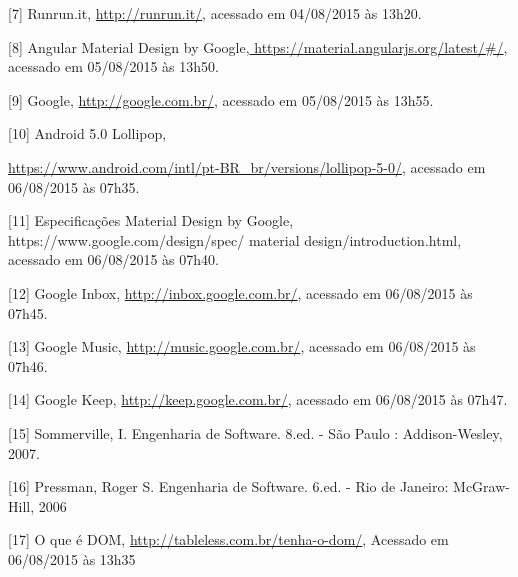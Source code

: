 \documentclass[
  12pt,				%
  openany,
  oneside,
  a4paper,			%
  english,			%
  brazil
]{article}
\numberwithin{figure}{section}
\numberwithin{table}{section}
\begin{document}
[7] Runrun.it, \url{http://runrun.it/}, acessado em 04/08/2015 às 13h20.

[8] Angular Material Design by Google,\url{ https://material.angularjs.org/latest/\#/}, acessado em 05/08/2015 às 13h50.

[9] Google, \url{http://google.com.br/}, acessado em 05/08/2015 às 13h55.

[10] Android 5.0 Lollipop,

\url{https://www.android.com/intl/pt-BR_br/versions/lollipop-5-0/},
acessado em 06/08/2015 às 07h35.

[11] Especificações Material Design by Google, https://www.google.com/design/spec/ material design/introduction.html, acessado em 06/08/2015 às 07h40.

[12] Google Inbox, \url{http://inbox.google.com.br/}, acessado em 06/08/2015 às 07h45.

[13] Google Music, \url{http://music.google.com.br/}, acessado em 06/08/2015 às 07h46.

[14] Google Keep, \url{http://keep.google.com.br/}, acessado em 06/08/2015 às 07h47.

[15] Sommerville, I. Engenharia de Software. 8.ed. - São Paulo : Addison-Wesley, 2007.

[16] Pressman, Roger S. Engenharia de Software. 6.ed. - Rio de Janeiro: McGraw-Hill, 2006

[17] O que é DOM, \url{http://tableless.com.br/tenha-o-dom/}, Acessado em 06/08/2015 às 13h35
\end{document}

